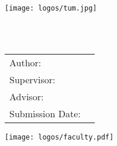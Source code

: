 \begin{titlepage}
  \centering

  \vspace{40mm}
  \texttt{[image: logos/tum.jpg]}

  \vspace{5mm}
  {\huge\MakeUppercase{\getFaculty{}}}\\

  \vspace{5mm}
  {\large\MakeUppercase{\getUniversity{}}}\\

  \vspace{20mm}
  {\Large \getDoctype{}}

  \vspace{15mm}
  {\huge\bfseries \getTitle{}}

  \vspace{15mm}
  \begin{tabular}{l l}
    Author: & \getAuthor{} \\
    Supervisor: & \getSupervisor{} \\
    Advisor: & \getAdvisor{} \\
    Submission Date: & \getSubmissionDate{} \\
  \end{tabular}

	\centering
  \vspace{15mm}
  \texttt{[image: logos/faculty.pdf]}
\end{titlepage}
